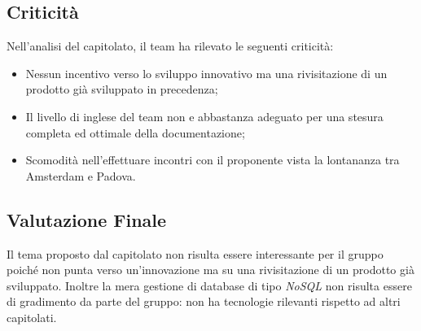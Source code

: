 \subsection{Criticità}
Nell'analisi del capitolato, il team ha rilevato le seguenti criticità:
\begin{itemize}
	\item Nessun incentivo verso lo sviluppo innovativo ma una rivisitazione di un prodotto già sviluppato in precedenza; 
	\item Il livello di inglese del team non e abbastanza adeguato per una stesura completa ed ottimale della documentazione; 	
	\item Scomodità nell'effettuare incontri con il proponente vista la lontananza tra Amsterdam e Padova.
\end{itemize}

\subsection{Valutazione Finale}
Il tema proposto dal capitolato non risulta essere interessante per il gruppo poiché non punta verso un'innovazione ma su una rivisitazione di un prodotto già sviluppato.
Inoltre la mera gestione di database di tipo \textit{NoSQL} non risulta essere di gradimento da parte del gruppo: non ha tecnologie rilevanti rispetto ad altri capitolati. 


